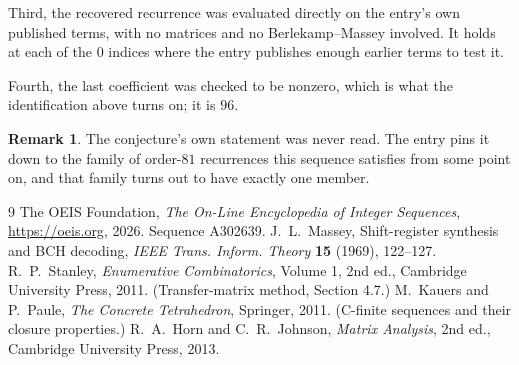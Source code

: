 \documentclass[11pt,a4paper]{article}
\theoremstyle{plain}
\theoremstyle{definition}
\newtheorem{remark}[theorem]{Remark}
\begin{document}
Third, the recovered recurrence was evaluated directly on the entry's own published terms, with
no matrices and no Berlekamp--Massey involved. It holds at each of the $0$ indices where
the entry publishes enough earlier terms to test it.

Fourth, the last coefficient was checked to be nonzero, which is what the identification above
turns on; it is $96$.

\begin{remark}
The conjecture's own statement was never read. The entry pins it down to the family of
order-$81$ recurrences this sequence satisfies from some point on, and that family turns
out to have exactly one member.
\end{remark}

\begin{thebibliography}{9}
 The OEIS Foundation, \emph{The On-Line Encyclopedia of Integer
Sequences}, \url{https://oeis.org}, 2026. Sequence A302639.
 J.~L.~Massey, Shift-register synthesis and BCH decoding, \emph{IEEE
Trans. Inform. Theory} \textbf{15} (1969), 122--127.
 R.~P.~Stanley, \emph{Enumerative Combinatorics}, Volume 1, 2nd ed.,
Cambridge University Press, 2011. (Transfer-matrix method, Section 4.7.)
 M.~Kauers and P.~Paule, \emph{The Concrete Tetrahedron}, Springer, 2011.
(C-finite sequences and their closure properties.)
 R.~A.~Horn and C.~R.~Johnson, \emph{Matrix Analysis}, 2nd ed., Cambridge
University Press, 2013.
\end{thebibliography}
\end{document}
